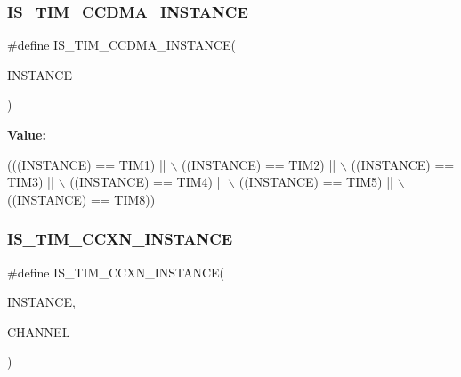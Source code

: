 \subsubsection{\texorpdfstring{I\+S\+\_\+\+T\+I\+M\+\_\+\+C\+C\+D\+M\+A\+\_\+\+I\+N\+S\+T\+A\+N\+CE}{IS\_TIM\_CCDMA\_INSTANCE}}
{\footnotesize\ttfamily \#define I\+S\+\_\+\+T\+I\+M\+\_\+\+C\+C\+D\+M\+A\+\_\+\+I\+N\+S\+T\+A\+N\+CE(\begin{DoxyParamCaption}\item[{}]{I\+N\+S\+T\+A\+N\+CE }\end{DoxyParamCaption})}

{\bfseries Value\+:}
\begin{DoxyCode}
(((INSTANCE) == TIM1) || \(\backslash\)
                                          ((INSTANCE) == TIM2) || \(\backslash\)
                                          ((INSTANCE) == TIM3) || \(\backslash\)
                                          ((INSTANCE) == TIM4) || \(\backslash\)
                                          ((INSTANCE) == TIM5) || \(\backslash\)
                                          ((INSTANCE) == TIM8))
\end{DoxyCode}
\mbox{\label{group___exported__macros_ga7181cfd1649c4e65e24b7c863e94a54f}} 
\subsubsection{\texorpdfstring{I\+S\+\_\+\+T\+I\+M\+\_\+\+C\+C\+X\+N\+\_\+\+I\+N\+S\+T\+A\+N\+CE}{IS\_TIM\_CCXN\_INSTANCE}}
{\footnotesize\ttfamily \#define I\+S\+\_\+\+T\+I\+M\+\_\+\+C\+C\+X\+N\+\_\+\+I\+N\+S\+T\+A\+N\+CE(\begin{DoxyParamCaption}\item[{}]{I\+N\+S\+T\+A\+N\+CE,  }\item[{}]{C\+H\+A\+N\+N\+EL }\end{DoxyParamCaption})}

